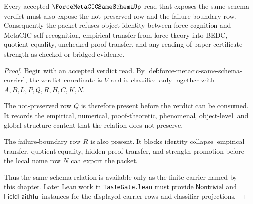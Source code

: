 \begin{theorem}
\label{thm:force-metacic-same-schema-refusal-boundary}
Every accepted $\ForceMetaCICSameSchemaUp$ read that exposes the same-schema verdict must also expose the not-preserved row and the failure-boundary row. Consequently the packet refuses object identity between force cognition and MetaCIC self-recognition, empirical transfer from force theory into BEDC, quotient equality, unchecked proof transfer, and any reading of paper-certificate strength as checked or bridged evidence.
\end{theorem}
\begin{proof}
Begin with an accepted verdict read. By \autoref{def:force-metacic-same-schema-carrier}, the verdict coordinate is $V$ and is classified only together with $A,B,L,P,Q,R,H,C,K,N$.

The not-preserved row $Q$ is therefore present before the verdict can be consumed. It records the empirical, numerical, proof-theoretic, phenomenal, object-level, and global-structure content that the relation does not preserve.

The failure-boundary row $R$ is also present. It blocks identity collapse, empirical transfer, quotient equality, hidden proof transfer, and strength promotion before the local name row $N$ can export the packet.

Thus the same-schema relation is available only as the finite carrier named by this chapter. Later Lean work in \texttt{TasteGate.lean} must provide $\mathsf{Nontrivial}$ and $\mathsf{FieldFaithful}$ instances for the displayed carrier rows and classifier projections.
\end{proof}




